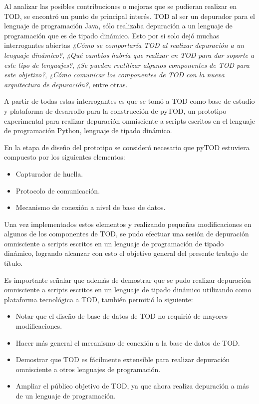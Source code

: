 \documentclass[12pt,legalpaper]{report}
\begin{document}
Al analizar las posibles contribuciones o mejoras que se pudieran realizar en TOD, se encontró un punto de principal interés.  TOD al ser un depurador para el lenguaje de programación Java, sólo realizaba depuración a un lenguaje de programación que es de tipado dinámico.  Esto por si solo dejó muchas interrogantes abiertas \textit{¿Cómo se comportaría TOD al realizar depuración a un lenguaje dinámico?}, \textit{¿Qué cambios habría que realizar en TOD para dar soporte a este tipo de lenguajes?}, \textit{¿Se pueden reutilizar algunos componentes de TOD para este objetivo?}, \textit{¿Cómo comunicar los componentes de TOD con la nueva arquitectura de depuración?}, entre otras.

A partir de todas estas interrogantes es que se tomó a TOD como base de estudio y plataforma de desarrollo para la construcción de pyTOD, un prototipo experimental para realizar depuración omnisciente a scripts escritos en el lenguaje de programación Python, lenguaje de tipado dinámico.


En la etapa de diseño del prototipo se consideró necesario que pyTOD estuviera compuesto por los siguientes elementos:

\begin{itemize}
	\item Capturador de huella.
	\item Protocolo de comunicación.
	\item Mecanismo de conexión a nivel de base de datos.
\end{itemize}

Una vez implementados estos elementos y realizando pequeñas modificaciones en algunos de los componentes de TOD, se pudo efectuar una sesión de depuración omnisciente a scripts escritos en un lenguaje de programación de tipado dinámico, logrando alcanzar con esto el objetivo general del presente trabajo de título.

Es importante señalar que además de demostrar que se pudo realizar depuración omnisciente a scripts escritos en un lenguaje de tipado dinámico utilizando como plataforma tecnológica a TOD, también permitió lo siguiente:

\begin{itemize}
	\item Notar que el diseño de base de datos de TOD no requirió de mayores modificaciones.
	\item Hacer más general el mecanismo de conexión a la base de datos de TOD.
	\item Demostrar que TOD es fácilmente extensible para realizar depuración omnisciente a otros lenguajes de programación.
	\item Ampliar el público objetivo de TOD, ya que ahora realiza depuración a más de un lenguaje de programación.
\end{itemize}
\end{document}
